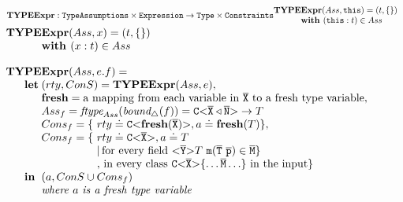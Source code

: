 \documentclass[runningheads]{llncs}
\begin{document}
\smallskip

$\textbf{TYPEExpr}:\texttt{TypeAssumptions} \times
\texttt{Expression} \rightarrow \texttt{Type} \times \texttt{Constraints}\\
\begin{array}{@{}l@{}l}
\textbf{TY} \textbf{PE} & \textbf{Expr} (Ass, \mathtt{this}) = (t , \{\})\\
& \textbf{with } (\mathtt{this} : t) \in Ass 
\end{array}
$
\smallskip
$\begin{array}{@{}l@{}l}
\textbf{TY} \textbf{PE} & \textbf{Expr} (Ass,x) = (t , \{\})\\
& \textbf{with } (x : t) \in Ass 
\end{array}
$

\smallskip

$\begin{array}{@{}l@{}l@{}l}
\textbf{TY}& \textbf{PE} & \textbf{Expr} (Ass, e.f) = \\
& \textbf{let} %
& (rty, ConS) = \textbf{TYPEExpr}(Ass, e),\\
& & \textbf{fresh} = \text{a mapping from each variable in}\ \ol{X} \ \text{to a fresh type variable},\\
& & Ass_{f} = \textit{ftype}_{Ass}(\textit{bound}_\triangle(f)) = \exptype{C}{\ol{X} \triangleleft \ol{N}} \to T \\
& & Cons_{f} = \{\ rty \doteq \exptype{C}{\textbf{fresh}(\ol{X})}, a \doteq \textbf{fresh}(T)\},\\
& & \begin{array}{@{}l@{}l}
  Cons_{f} = \{\ & rty \doteq \exptype{C}{\ol{X}}, a \doteq T \\
              & |\, \text{for every field}\ \exptype{}{\ol{Y}} T\ \texttt{m}(\ol{T}\  \ol{p}) \in \ol{M} \} \\%
              & ,\, \text{in every class}\ \exptype{C}{\ol{X}} \{ \ldots \ol{M} \ldots \}\ \text{in the input} \} 
            \end{array}\\
& \mathbf{in}%
& (a, ConS \cup Cons_{f})\\
& & \mathit{where\ } a \mathit{\ is\ a\ fresh\
  type\ variable}\\ 
\end{array}
$
\end{document}
